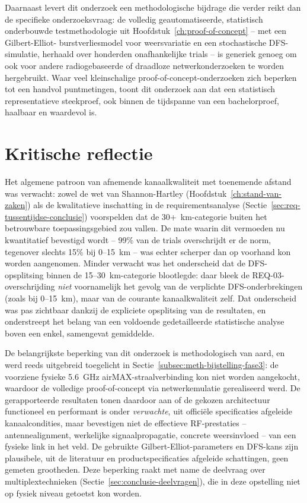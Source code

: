 Daarnaast levert dit onderzoek een methodologische bijdrage die verder reikt dan de
specifieke onderzoeksvraag: de volledig geautomatiseerde, statistisch onderbouwde
testmethodologie uit Hoofdstuk~\ref{ch:proof-of-concept} -- met een Gilbert-Elliot-
burstverliesmodel voor weersvariatie en een stochastische DFS-simulatie, herhaald over
honderden onafhankelijke trials -- is generiek genoeg om ook voor andere
radiogebaseerde of draadloze netwerkonderzoeken te worden hergebruikt. Waar veel
kleinschalige proof-of-concept-onderzoeken zich beperken tot een handvol
puntmetingen, toont dit onderzoek aan dat een statistisch representatieve steekproef,
ook binnen de tijdspanne van een bachelorproef, haalbaar en waardevol is.
 
\section{Kritische reflectie}%
\label{sec:conclusie-reflectie}
 
Het algemene patroon van afnemende kanaalkwaliteit met toenemende afstand was verwacht:
zowel de wet van Shannon-Hartley (Hoofdstuk~\ref{ch:stand-van-zaken}) als de
kwalitatieve inschatting in de requirementsanalyse (Sectie~\ref{sec:req-tussentijdse-conclusie})
voorspelden dat de 30+~km-categorie buiten het betrouwbare toepassingsgebied zou vallen.
De mate waarin dit vermoeden nu kwantitatief bevestigd wordt -- 99\% van de trials
overschrijdt er de norm, tegenover slechts 15\% bij 0--15~km -- was echter scherper dan
op voorhand kon worden aangenomen. Minder verwacht was het onderscheid dat de
DFS-opsplitsing binnen de 15--30~km-categorie blootlegde: daar bleek de
REQ-03-overschrijding \emph{niet} voornamelijk het gevolg van de verplichte
DFS-onderbrekingen (zoals bij 0--15~km), maar van de courante kanaalkwaliteit zelf. Dat
onderscheid was pas zichtbaar dankzij de expliciete opsplitsing van de resultaten, en
onderstreept het belang van een voldoende gedetailleerde statistische analyse boven een
enkel, samengevat gemiddelde.
 
De belangrijkste beperking van dit onderzoek is methodologisch van aard, en werd reeds
uitgebreid toegelicht in Sectie~\ref{subsec:meth-bijstelling-fase3}: de voorziene
fysieke 5.6~GHz airMAX-straalverbinding kon niet worden aangekocht, waardoor de volledige
proof-of-concept via netwerkemulatie gerealiseerd werd. De gerapporteerde resultaten
tonen daardoor aan of de gekozen architectuur functioneel en performant is onder
\emph{verwachte}, uit officiële specificaties afgeleide kanaalcondities, maar
bevestigen niet de effectieve RF-prestaties -- antennealignment, werkelijke
signaalpropagatie, concrete weersinvloed -- van een fysieke link in het veld. De
gebruikte Gilbert-Elliot-parameters en DFS-kans zijn plausibele, uit de literatuur en
productspecificaties afgeleide schattingen, geen gemeten grootheden. Deze beperking
raakt met name de deelvraag over multiplextechnieken (Sectie~\ref{sec:conclusie-deelvragen}),
die in deze opstelling niet op fysiek niveau getoetst kon worden.
 
